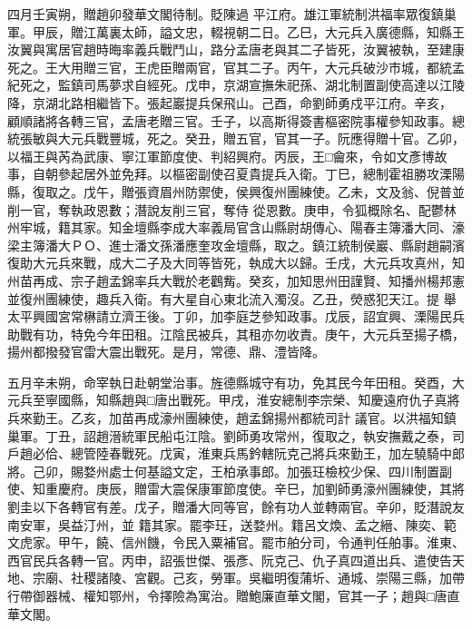 \begin{pinyinscope}
 四月壬寅朔，贈趙卯發華文閣待制。貶陳過
 平江府。雄江軍統制洪福率眾復鎮巢軍。甲辰，贈江萬裏太師，謚文忠，輟視朝二日。乙巳，大元兵入廣德縣，知縣王汝翼與寓居官趙時晦率義兵戰鬥山，路分孟唐老與其二子皆死，汝翼被執，至建康死之。王大用贈三官，王虎臣贈兩官，官其二子。丙午，大元兵破沙市城，都統孟紀死之，監鎮司馬夢求自經死。戊申，京湖宣撫朱祀孫、湖北制置副使高達以江陵降，京湖北路相繼皆下。張起巖提兵保飛山。己酉，命劉師勇戍平江府。辛亥，
 顧順諸將各轉三官，孟唐老贈三官。壬子，以高斯得簽書樞密院事權參知政事。總統張敏與大元兵戰豐城，死之。癸丑，贈五官，官其一子。阮應得贈十官。乙卯，以福王與芮為武康、寧江軍節度使、判紹興府。丙辰，王□龠來，令如文彥博故事，自朝參起居外並免拜。以樞密副使召夏貴提兵入衛。丁巳，總制霍祖勝攻溧陽縣，復取之。戊午，贈張資眉州防禦使，侯興復州團練使。乙未，文及翁、倪普並削一官，奪執政恩數；潛說友削三官，奪侍
 從恩數。庚申，令狐概除名、配鬱林州牢城，籍其家。知金壇縣李成大率義局官含山縣尉胡傳心、陽春主簿潘大同、濠梁主簿潘大ＰＯ、進士潘文孫潘應奎攻金壇縣，取之。鎮江統制侯巖、縣尉趙嗣濱復助大元兵來戰，成大二子及大同等皆死，執成大以歸。壬戌，大元兵攻真州，知州苗再成、宗子趙孟錦率兵大戰於老鸛觜。癸亥，加知思州田謹賢、知播州楊邦憲並復州團練使，趣兵入衛。有大星自心東北流入濁沒。乙丑，熒惑犯天江。提
 舉太平興國宮常楙請立濟王後。丁卯，加李庭芝參知政事。戊辰，詔宜興、溧陽民兵助戰有功，特免今年田租。江陰民被兵，其租亦勿收責。庚午，大元兵至揚子橋，揚州都撥發官雷大震出戰死。是月，常德、鼎、澧皆降。



 五月辛未朔，命宰執日赴朝堂治事。旌德縣城守有功，免其民今年田租。癸酉，大元兵至寧國縣，知縣趙與□唐出戰死。甲戌，淮安總制李宗榮、知慶遠府仇子真將兵來勤王。乙亥，加苗再成濠州團練使，趙孟錦揚州都統司計
 議官。以洪福知鎮巢軍。丁丑，詔趙溍統軍民船屯江陰。劉師勇攻常州，復取之，執安撫戴之泰，司戶趙必佮、總管陸春戰死。戊寅，淮東兵馬鈐轄阮克己將兵來勤王，加左驍騎中郎將。己卯，賜婺州處士何基謚文定，王柏承事郎。加張玨檢校少保、四川制置副使、知重慶府。庚辰，贈雷大震保康軍節度使。辛巳，加劉師勇濠州團練使，其將劉圭以下各轉官有差。戊子，贈潘大同等官，餘有功人並轉兩官。辛卯，貶潛說友南安軍，吳益汀州，並
 籍其家。罷李玨，送婺州。籍呂文煥、孟之縉、陳奕、範文虎家。甲午，饒、信州饑，令民入粟補官。罷市舶分司，令通判任舶事。淮東、西官民兵各轉一官。丙申，詔張世傑、張彥、阮克己、仇子真四道出兵、遣使告天地、宗廟、社稷諸陵、宮觀。己亥，勞軍。吳繼明復蒲圻、通城、崇陽三縣，加帶行帶御器械、權知鄂州，令擇險為寓治。贈鮑廉直華文閣，官其一子；趙與□唐直華文閣。




\end{pinyinscope}
